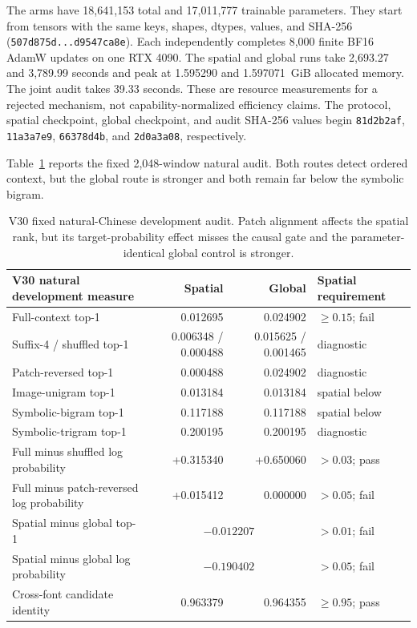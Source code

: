 \documentclass[11pt]{article}
\begin{document}
The arms have 18,641,153 total and 17,011,777 trainable parameters. They start
from tensors with the same keys, shapes, dtypes, values, and SHA-256
(\texttt{507d875d...d9547ca8e}). Each independently completes 8,000 finite BF16
AdamW updates on one RTX 4090. The spatial and global runs take 2,693.27 and
3,789.99 seconds and peak at 1.595290 and 1.597071~GiB allocated memory. The
joint audit takes 39.33 seconds. These are resource measurements for a rejected
mechanism, not capability-normalized efficiency claims. The protocol, spatial
checkpoint, global checkpoint, and audit SHA-256 values begin
\texttt{81d2b2af}, \texttt{11a3a7e9}, \texttt{66378d4b}, and
\texttt{2d0a3a08}, respectively.

Table~\ref{tab:v30natural} reports the fixed 2,048-window natural audit. Both
routes detect ordered context, but the global route is stronger and both remain
far below the symbolic bigram.

\begin{table}[h!]
\centering
\footnotesize
\begin{tabular}{lrrl}
\toprule
V30 natural development measure & Spatial & Global & Spatial requirement \\
\midrule
Full-context top-1 & 0.012695 & 0.024902 & $\geq0.15$; fail \\
Suffix-4 / shuffled top-1 & 0.006348 / 0.000488 & 0.015625 / 0.001465 & diagnostic \\
Patch-reversed top-1 & 0.000488 & 0.024902 & diagnostic \\
Image-unigram top-1 & 0.013184 & 0.013184 & spatial below \\
Symbolic-bigram top-1 & 0.117188 & 0.117188 & spatial below \\
Symbolic-trigram top-1 & 0.200195 & 0.200195 & diagnostic \\
Full minus shuffled log probability & +0.315340 & +0.650060 & $>0.03$; pass \\
Full minus patch-reversed log probability & +0.015412 & 0.000000 & $>0.05$; fail \\
Spatial minus global top-1 & \multicolumn{2}{c}{$-0.012207$} & $>0.01$; fail \\
Spatial minus global log probability & \multicolumn{2}{c}{$-0.190402$} & $>0.05$; fail \\
Cross-font candidate identity & 0.963379 & 0.964355 & $\geq0.95$; pass \\
\bottomrule
\end{tabular}
\caption{V30 fixed natural-Chinese development audit. Patch alignment affects
the spatial rank, but its target-probability effect misses the causal gate and
the parameter-identical global control is stronger.}
\label{tab:v30natural}
\end{table}
\end{document}

